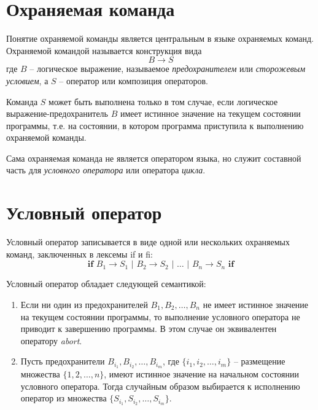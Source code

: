 \section{Охраняемая команда}

Понятие охраняемой команды является центральным в языке охраняемых команд. 
Охраняемой командой называется конструкция вида
\begin{equation}
	B \rightarrow S
\end{equation}
где $B$ -- логическое выражение, называемое \textit{предохранителем} или \textit{сторожевым условием}, 
а $S$ -- оператор или композиция операторов.

Команда $S$ может быть выполнена только в том случае, если логическое выражение-предохранитель $B$ имеет истинное значение
на текущем состоянии программы, т.е. на состоянии, в котором программа приступила к выполнению охраняемой команды.

Сама охраняемая команда не является оператором языка, но служит составной часть для \textit{условного оператора} или оператора \textit{цикла}.

\section{Условный оператор}
\newcommand{\IF}{\textbf{if } B_1 \rightarrow S_1 \text{ | } B_2 \rightarrow S_2 \text{ | } \ldots \text{ | } B_n \rightarrow S_n \textbf{ if}}

Условный оператор записывается в виде одной или нескольких охраняемых команд, 
заключенных в лексемы if и fi:
\begin{equation}
\IF
\end{equation}

Условный оператор обладает следующей семантикой:
\begin{enumerate}
	\item Если ни один из предохранителей $B_1, B_2, \ldots, B_n$ не имеет истинное значение на 
	текущем состоянии программы, то выполнение условного оператора не приводит к завершению программы.
	В этом случае он эквивалентен оператору \textit{abort}.
	\item Пусть предохранители $B_{i_1}, B_{i_2},\ldots, B_{i_m}$, где $\{i_1, i_2, \ldots, i_m\}$ -- размещение 
	множества $\{1, 2, \ldots, n\}$, имеют истинное значение на начальном состоянии условного оператора.
	Тогда случайным образом выбирается к исполнению оператор из множества $\{S_{i_1}, S_{i_2}, \ldots, S_{i_m}\}$.
\end{enumerate}

